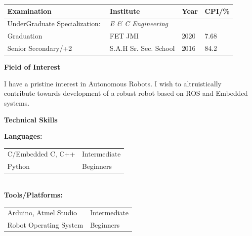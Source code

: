 \documentclass[a4paper,12pt,final]{memoir}
\newcommand{\Sep}{\vspace{1.5em}}
\newcommand{\SmallSep}{\vspace{0.5em}}
\newcommand{\CVSection}[1]
	{\Large\textbf{#1}\par
	\SmallSep\normalsize\normalfont}
\newcommand{\CVItem}[1]
	{\textbf{\color{RoyalBlue} #1}}
\begin{document}
\indent \begin{tabular}{ l l l l}
\hline
\textbf{\color{RoyalBlue}Examination} & \textbf{\color{RoyalBlue}Institute} & \textbf{\color{RoyalBlue}Year} & \textbf{\color{RoyalBlue}CPI/\%} \\
\hline
UnderGraduate Specialization:\,\, & \textit{E \& C Engineering} \\
Graduation & FET JMI & 2020 & 7.68 \\
\hline
Senior Secondary/+2 & S.A.H Sr. Sec. School & 2016 & 84.2\\
\hline
\end{tabular}
\Sep

\CVSection{Field of Interest}

\begin{compactitem}[\color{RoyalBlue}$\circ$]
\item\noindent I have a pristine interest in Autonomous Robots. I wish to altruistically contribute towards development of a robust robot based on ROS and Embedded systems.
\end{compactitem}
\SmallSep

\CVSection{Technical Skills}
\CVItem{Languages:}
\\
\begin{tabular}{l l}
C/Embedded C, C++ & Intermediate\\
Python & Beginners
\end{tabular} 
\\
\CVItem{Tools/Platforms:}
\\
\begin{tabular}{l l}
Arduino, Atmel Studio & Intermediate\\
Robot Operating System & Beginners\\

\end{tabular}
\Sep
\end{document}
